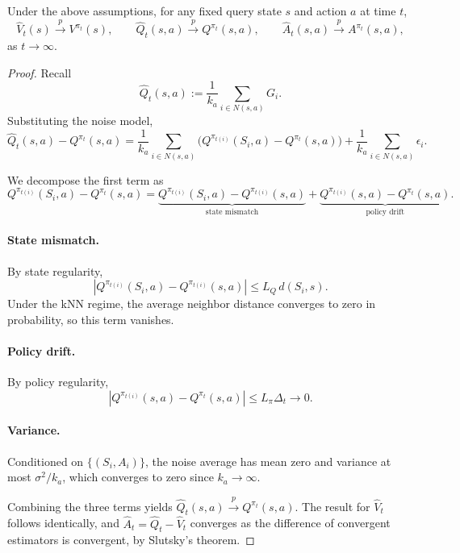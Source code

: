 \begin{theorem}
Under the above assumptions, for any fixed query state $s$ and action $a$ at time
$t$,
\[
\widehat V_t(s) \xrightarrow{p} V^{\pi_t}(s), \qquad
\widehat Q_t(s,a) \xrightarrow{p} Q^{\pi_t}(s,a), \qquad
\widehat A_t(s,a) \xrightarrow{p} A^{\pi_t}(s,a),
\]
as $t\to\infty$.
\end{theorem}

\begin{proof}

Recall
\[
\widehat Q_t(s,a) := \frac{1}{k_a}\sum_{i\in N(s,a)} G_i .
\]
Substituting the noise model,
\[
\widehat Q_t(s,a) - Q^{\pi_t}(s,a)
= \frac{1}{k_a}\sum_{i\in N(s,a)}
\big(Q^{\pi_{t(i)}}(S_i,a) - Q^{\pi_t}(s,a)\big)
+ \frac{1}{k_a}\sum_{i\in N(s,a)} \epsilon_i .
\]

We decompose the first term as
\[
Q^{\pi_{t(i)}}(S_i,a) - Q^{\pi_t}(s,a)
=
\underbrace{Q^{\pi_{t(i)}}(S_i,a) - Q^{\pi_{t(i)}}(s,a)}_{\text{state mismatch}}
+
\underbrace{Q^{\pi_{t(i)}}(s,a) - Q^{\pi_t}(s,a)}_{\text{policy drift}} .
\]

\paragraph{State mismatch.}
By state regularity,
\[
|Q^{\pi_{t(i)}}(S_i,a) - Q^{\pi_{t(i)}}(s,a)| \le L_Q\, d(S_i,s).
\]
Under the kNN regime, the average neighbor distance converges to zero in
probability, so this term vanishes.

\paragraph{Policy drift.}
By policy regularity,
\[
|Q^{\pi_{t(i)}}(s,a) - Q^{\pi_t}(s,a)| \le L_\pi \Delta_t \xrightarrow{} 0 .
\]

\paragraph{Variance.}
Conditioned on $\{(S_i,A_i)\}$, the noise average has mean zero and variance at
most $\sigma^2/k_a$, which converges to zero since $k_a\to\infty$.

Combining the three terms yields
$\widehat Q_t(s,a) \xrightarrow{p} Q^{\pi_t}(s,a)$.
The result for $\widehat V_t$ follows identically, and
$\widehat A_t = \widehat Q_t - \widehat V_t$ converges as the difference of convergent estimators is convergent, by Slutsky's theorem.
\end{proof}

